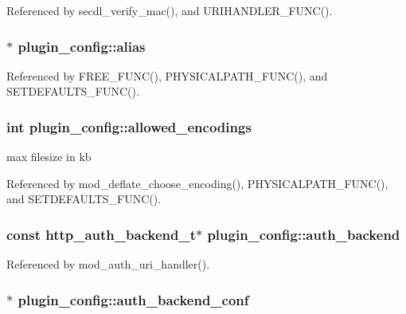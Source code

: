 Referenced by secdl\-\_\-verify\-\_\-mac(), and U\-R\-I\-H\-A\-N\-D\-L\-E\-R\-\_\-\-F\-U\-N\-C().

\hypertarget{structplugin__config_a54b001d895399c170c3911957611c797}{
\subsubsection[{alias}]{$\ast$ plugin\-\_\-config\-::alias}}\label{structplugin__config_a54b001d895399c170c3911957611c797}


Referenced by F\-R\-E\-E\-\_\-\-F\-U\-N\-C(), P\-H\-Y\-S\-I\-C\-A\-L\-P\-A\-T\-H\-\_\-\-F\-U\-N\-C(), and S\-E\-T\-D\-E\-F\-A\-U\-L\-T\-S\-\_\-\-F\-U\-N\-C().

\hypertarget{structplugin__config_a7a925bb5a8cf2be24c6f4db3cb3f9006}{
\subsubsection[{allowed\-\_\-encodings}]{\setlength{\rightskip}{0pt plus 5cm}int plugin\-\_\-config\-::allowed\-\_\-encodings}}\label{structplugin__config_a7a925bb5a8cf2be24c6f4db3cb3f9006}
max filesize in kb 

Referenced by mod\-\_\-deflate\-\_\-choose\-\_\-encoding(), P\-H\-Y\-S\-I\-C\-A\-L\-P\-A\-T\-H\-\_\-\-F\-U\-N\-C(), and S\-E\-T\-D\-E\-F\-A\-U\-L\-T\-S\-\_\-\-F\-U\-N\-C().

\hypertarget{structplugin__config_a0196a06e85c1f546d24c0c131a651ba4}{
\subsubsection[{auth\-\_\-backend}]{\setlength{\rightskip}{0pt plus 5cm}const {\bf http\-\_\-auth\-\_\-backend\-\_\-t}$\ast$ plugin\-\_\-config\-::auth\-\_\-backend}}\label{structplugin__config_a0196a06e85c1f546d24c0c131a651ba4}


Referenced by mod\-\_\-auth\-\_\-uri\-\_\-handler().

\hypertarget{structplugin__config_ad45ad20cd63f95db8fddec6d0a3acda5}{
\subsubsection[{auth\-\_\-backend\-\_\-conf}]{$\ast$ plugin\-\_\-config\-::auth\-\_\-backend\-\_\-conf}}\label{structplugin__config_ad45ad20cd63f95db8fddec6d0a3acda5}


